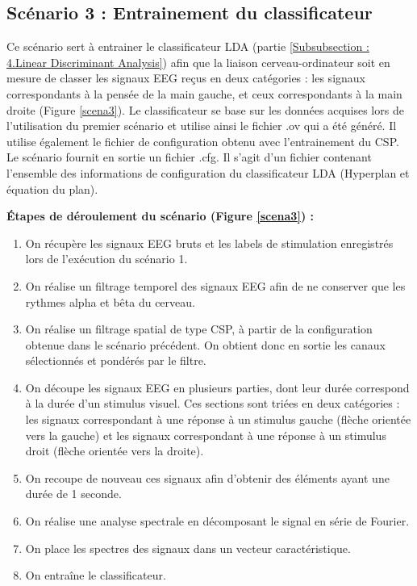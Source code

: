 \subsection{Scénario 3 : Entrainement du classificateur}
\label{Subsection : 6.Scénario 3}
Ce scénario sert à entrainer le classificateur LDA (partie \ref{Subsubsection : 4.Linear Discriminant Analysis}) afin que la liaison cerveau-ordinateur soit en mesure de classer les signaux EEG reçus en deux catégories : les signaux correspondants à la pensée de la main gauche, et ceux correspondants à la main droite (Figure \ref{scena3}). Le classificateur se base sur les données acquises lors de l'utilisation du premier scénario et utilise ainsi le fichier .ov qui a été généré. Il utilise également le fichier de configuration obtenu avec l'entrainement du CSP. Le scénario fournit en sortie un fichier .cfg. Il s'agit d'un fichier contenant l'ensemble des informations de configuration du classificateur LDA (Hyperplan et équation du plan).

\smallbreak
\textbf{Étapes de déroulement du scénario (Figure \ref{scena3}) : }
\smallbreak
\begin{enumerate}
	\item On récupère les signaux EEG bruts et les labels de stimulation enregistrés lors de l'exécution du scénario 1. 
	\smallbreak
	\item On réalise un filtrage temporel des signaux EEG afin de ne conserver que les rythmes alpha et bêta du cerveau.
	\smallbreak
	\item On réalise un filtrage spatial de type CSP, à partir de la configuration obtenue dans le scénario précédent. On obtient donc en sortie les canaux sélectionnés et pondérés par le filtre.
	\smallbreak
	\item On découpe les signaux EEG en plusieurs parties, dont leur durée correspond à la durée d'un stimulus visuel. Ces sections sont triées en deux catégories : les signaux correspondant à une réponse à un stimulus gauche (flèche orientée vers la gauche) et les signaux correspondant à une réponse à un stimulus droit (flèche orientée vers la droite).
	\smallbreak
	\item On recoupe de nouveau ces signaux afin d'obtenir des éléments ayant une durée de 1 seconde.
	\smallbreak
	\item On réalise une analyse spectrale en décomposant le signal en série de Fourier. 
	\smallbreak
	\item On place les spectres des signaux dans un vecteur caractéristique.
	\smallbreak
	\item On entraîne le classificateur. 
\end{enumerate}

